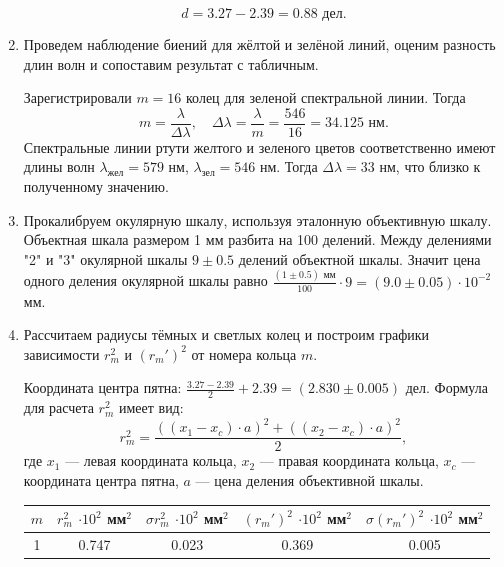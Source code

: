 \documentclass[a4paper, 12pt]{article}
\begin{document}
\begin{enumerate}
		\begin{equation*}
			d=3.27-2.39=0.88 \text{ дел}.
		\end{equation*}
		\item Проведем наблюдение биений для жёлтой и зелёной линий, оценим разность длин волн и сопоставим результат с табличным.\par
			Зарегистрировали $m=16$ колец для зеленой спектральной линии. Тогда
			\begin{equation*}
				m=\frac{\lambda}{\Delta\lambda},\quad \Delta\lambda=\frac{\lambda}{m}=\frac{546}{16}=34.125 \text{ нм}.
			\end{equation*}
			Спектральные линии ртути желтого и зеленого цветов соответственно имеют длины волн $\lambda_\text{жел}=579\text{ нм}$, $\lambda_\text{зел}=546\text{ нм}$. Тогда $\Delta\lambda=33$ нм, что близко к полученному значению.
		\item Прокалибруем окулярную шкалу, используя эталонную объективную шкалу. Объектная шкала размером 1 мм разбита на 100 делений. Между делениями "2" и "3" окулярной шкалы $9\pm0.5$ делений объектной шкалы. Значит цена одного деления окулярной шкалы равно $\frac{(1\pm0.5)\text{ мм}}{100}\cdot 9=(9.0\pm0.05)\cdot10^{-2}$ мм.
		\item Рассчитаем радиусы тёмных и светлых колец и построим графики зависимости $r_m^2$ и $(r_m')^2$ от номера кольца $m$.\par
			Координата центра пятна: $\frac{3.27-2.39}{2} + 2.39=(2.830\pm0.005)$ дел.
			Формула для расчета $r_{m}^2$ имеет вид:
			\begin{equation*}
				r_{m}^2=\frac{\left((x_1-x_c)\cdot a\right)^2+\left((x_2-x_c)\cdot a\right)^2}{2},
			\end{equation*}
			где $x_1$ — левая координата кольца, $x_2$ — правая координата кольца, $x_c$ — координата центра пятна, $a$ — цена деления объективной шкалы.
			\begin{table}[h]
				\centering
				\begin{tabular}{|c|c|c|c|c|}
					\hline
					$m$ & $r_{m}^2$ $\cdot 10^2$ мм$^2$ & $\sigma r_{m}^2$ $\cdot 10^2$ мм$^2$ & $(r_{m}')^2$ $\cdot 10^2$ мм$^2$ & $\sigma (r_{m}')^2$ $\cdot 10^2$ мм$^2$\\
					\hline
					1 & 0.747 & 0.023 & 0.369 & 0.005 \\

\end{tabular}
\end{table}
\end{enumerate}
\end{document}
